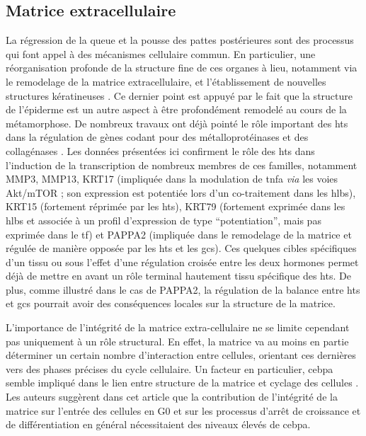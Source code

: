 \documentclass[../main.tex]{subfiles}
\begin{document}
	\subsection{Matrice extracellulaire}
		La régression de la queue et la pousse des pattes postérieures sont des processus qui font appel à des mécanismes cellulaire commun.
		En particulier, une réorganisation profonde de la structure fine de ces organes à lieu, notamment via le remodelage de la matrice extracellulaire, et l'établissement de nouvelles structures kératineuses \citep{Schreiber2003}.
		Ce dernier point est appuyé par le fait que la structure de l'épiderme est un autre aspect à être profondément remodelé au cours de la métamorphose.
		De nombreux travaux ont déjà pointé le rôle important des \glspl{ht} dans la régulation de gènes codant pour des métalloprotéinases et des collagénases \citep{Jung2004,Fu2007}.
		Les données présentées ici confirment le rôle des \glspl{ht} dans l'induction de la transcription de nombreux membres de ces familles, notamment MMP3, MMP13, KRT17 (impliquée dans la modulation de \gls{tnfa} \textit{via} les voies Akt/mTOR ; son expression est potentiée lors d'un co-traitement dans les \glspl{hlb}), KRT15 (fortement réprimée par les \glspl{ht}), KRT79 (fortement exprimée dans les \glspl{hlb} et associée à un profil d'expression de type ``potentiation'', mais pas exprimée dans le \gls{tf}) et PAPPA2 (impliquée dans le remodelage de la matrice et régulée de manière opposée par les \glspl{ht} et les \glspl{gc}).
		Ces quelques cibles spécifiques d'un tissu ou sous l'effet d'une régulation croisée entre les deux hormones permet déjà de mettre en avant un rôle terminal hautement tissu spécifique des \glspl{ht}.
		De plus, comme illustré dans le cas de PAPPA2, la régulation de la balance entre \glspl{ht} et \glspl{gc} pourrait avoir des conséquences locales sur la structure de la matrice.
		\par
		L'importance de l'intégrité de la matrice extra-cellulaire ne se limite cependant pas uniquement à un rôle structural.
		En effet, la matrice va au moins en partie déterminer un certain nombre d'interaction entre cellules, orientant ces dernières vers des phases précises du cycle cellulaire.
		Un facteur en particulier, \gls{cebpa} semble impliqué dans le lien entre structure de la matrice et cyclage des cellules \citep{Rana1994}.
		Les auteurs suggèrent dans cet article que la contribution de l'intégrité de la matrice sur l'entrée des cellules en G0 et sur les processus d’arrêt de croissance et de différentiation en général nécessitaient des niveaux élevés de \gls{cebpa}.
\end{document}

